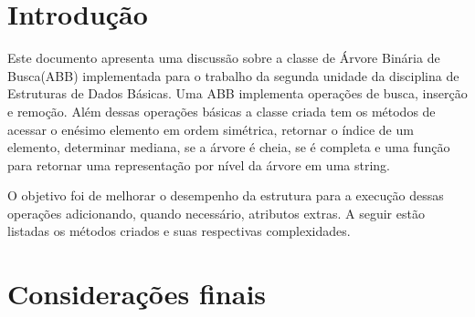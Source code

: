 \documentclass[
	article,			%
	12pt,				%
	oneside,			%
	a4paper,			%
	english,			%
	brazil,				%
	]{abntex2}
\begin{document}
\frenchspacing 


\imprimirfolhaderosto

\tableofcontents*
\cleardoublepage

\textual

\section*{Introdução}

Este documento apresenta uma discussão sobre a classe de Árvore Binária de 
Busca(ABB) 
implementada para o trabalho da segunda unidade da disciplina de Estruturas de 
Dados Básicas. 
Uma ABB implementa operações de busca, inserção e remoção. 
Além dessas operações básicas a classe criada tem os métodos de acessar o 
enésimo elemento em ordem simétrica, 
retornar o índice de um elemento, determinar mediana, se a árvore é cheia, se é 
completa e uma função para retornar uma representação por nível da árvore em 
uma string.

O objetivo foi de melhorar o desempenho da estrutura para a execução dessas 
operações adicionando, quando necessário, atributos extras. 
A seguir estão listadas os métodos criados e suas respectivas complexidades.






\section*{Considerações finais}
\end{document}
